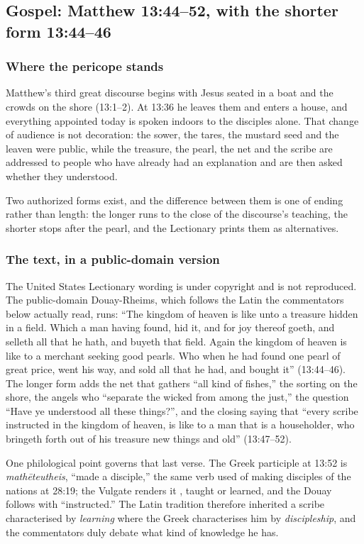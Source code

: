 \subsection*{Gospel: Matthew 13:44--52, with the shorter form 13:44--46}

\subsubsection*{Where the pericope stands}

Matthew's third great discourse begins with Jesus seated in a boat and the crowds on the shore (13:1--2). At 13:36 he leaves them and enters a house, and everything appointed today is spoken indoors to the disciples alone. That change of audience is not decoration: the sower, the tares, the mustard seed and the leaven were public, while the treasure, the pearl, the net and the scribe are addressed to people who have already had an explanation and are then asked whether they understood.

Two authorized forms exist, and the difference between them is one of ending rather than length: the longer runs to the close of the discourse's teaching, the shorter stops after the pearl, and the Lectionary prints them as alternatives.

\subsubsection*{The text, in a public-domain version}

The United States Lectionary wording is under copyright and is not reproduced. The public-domain Douay-Rheims, which follows the Latin the commentators below actually read, runs: ``The kingdom of heaven is like unto a treasure hidden in a field. Which a man having found, hid it, and for joy thereof goeth, and selleth all that he hath, and buyeth that field. Again the kingdom of heaven is like to a merchant seeking good pearls. Who when he had found one pearl of great price, went his way, and sold all that he had, and bought it'' (13:44--46). The longer form adds the net that gathers ``all kind of fishes,'' the sorting on the shore, the angels who ``separate the wicked from among the just,'' the question ``Have ye understood all these things?'', and the closing saying that ``every scribe instructed in the kingdom of heaven, is like to a man that is a householder, who bringeth forth out of his treasure new things and old'' (13:47--52).

One philological point governs that last verse. The Greek participle at 13:52 is \emph{math\=eteutheis}, ``made a disciple,'' the same verb used of making disciples of the nations at 28:19; the Vulgate renders it , taught or learned, and the Douay follows with ``instructed.'' The Latin tradition therefore inherited a scribe characterised by \emph{learning} where the Greek characterises him by \emph{discipleship}, and the commentators duly debate what kind of knowledge he has.

